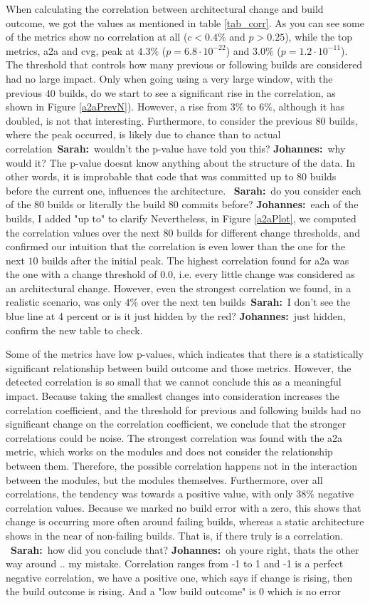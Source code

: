 \documentclass[sigplan, anonymous, review]{acmart}
\newcommand{\sn}[1]{{\color{blue}\textbf{Sarah:}~#1}}
\newcommand{\jk}[1]{{\color{violet}\textbf{Johannes:}~#1}}
\begin{document}
When calculating the correlation between architectural change and build outcome, we got the values as mentioned in table \ref{tab_corr}. As you can see some of the metrics show no correlation at all ($c < 0.4\%$ and $p > 0.25$), while the top metrics, a2a and cvg, peak at $4.3\%$ ($p = 6.8 \cdot 10^{-22}$) and $3.0\%$ ($p=1.2 \cdot 10^{-11}$). 
The threshold that controls how many previous or following builds are considered had no large impact. Only when going using a very large window, with the previous $40$ builds, do we start to see a significant rise in the correlation, as shown in Figure \ref{a2aPrevN}). However, a rise from $3\%$ to $6\%$, although it has doubled, is not that interesting. Furthermore, to consider the previous $80$ builds, where the peak occurred, is likely due to chance than to actual correlation~\sn{wouldn't the p-value have told you this?} \jk{why would it? The p-value doesnt know anything about the structure of the data}. In other words, it is improbable that code that was committed up to $80$ builds before the current one, influences the architecture. ~\sn{do you consider each of the 80 builds or literally the build 80 commits before?} \jk{each of the builds, I added "up to" to clarify}
Nevertheless, in Figure \ref{a2aPlot}, we computed the correlation values over the next $80$ builds for different change thresholds, and confirmed our intuition that the correlation is even lower than the one for the next $10$ builds after the initial peak.
The highest correlation found for a2a was the one with a change threshold of $0.0$, i.e. every little change was considered as an architectural change. However, even the strongest correlation we found, in a realistic scenario, was only $4\%$ over the next ten builds~\sn{I don't see the blue line at 4 percent or is it just hidden by the red?} \jk{just hidden, confirm the new table to check}. 

Some of the metrics have low p-values, which indicates that there is a statistically significant relationship between build outcome and those metrics. However, the detected correlation is so small that we cannot conclude this as a meaningful impact. Because taking the smallest changes into consideration increases the correlation coefficient, and the threshold for previous and following builds had no significant change on the correlation coefficient, we conclude that the stronger correlations could be noise. 
The strongest correlation was found with the a2a metric, which works on the modules and does not consider the relationship between them. Therefore, the possible correlation happens not in the interaction between the modules, but the modules themselves. Furthermore, over all correlations, the tendency was towards a positive value, with only $38\%$ negative correlation values. Because we marked no build error with a zero, this shows that change is occurring more often around failing builds, whereas a static architecture shows in the near of non-failing builds. That is, if there truly is a correlation.
~\sn{how did you conclude that?} \jk{oh youre right, thats the other way around .. my mistake. Correlation ranges from -1 to 1 and -1 is a perfect negative correlation, we have a positive one, which says if change is rising, then the build outcome is rising. And a "low build outcome" is 0 which is no error}
\end{document}
